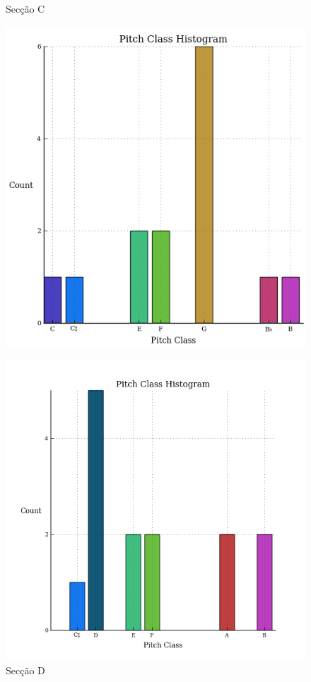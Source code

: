 \documentclass[
	12pt,				%
	openright,			%
	twoside,			%
	a4paper,			%
	english,			%
	french,				%
	spanish,			%
	brazil				%
	]{abntex2}
\begin{document}
\begin{figure}[htb]
 \centering
  \begin{minipage}{0.4\textwidth}
    \centering
    \caption{Secção C} \label{fig_minipage_imagem1}
    \includegraphics[scale=0.6]{mikro/C.png}
  \end{minipage}
  \hfill
  \begin{minipage}{0.4\textwidth}
    \centering
    \caption{Secção D} \label{fig_minipage_grafico2}
    \includegraphics[scale=0.6]{mikro/D.png}
  \end{minipage}
\end{figure}
\pagebreak
\end{document}
